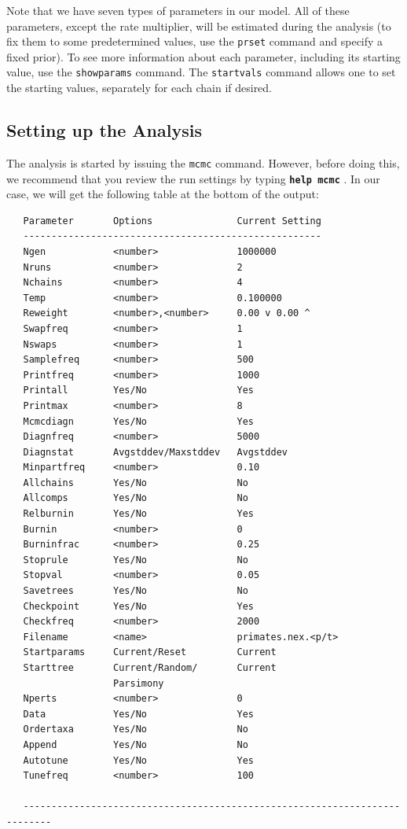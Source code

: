 \documentclass[12pt]{book}
\newcommand{\ttt}[1]{\texttt{#1} }
\newcommand{\tb}[1]{\ttt{\textbf{#1}} }
\begin{document}
Note that we have seven types of parameters in our model. All of these parameters, except the rate
multiplier, will be estimated during the analysis (to fix them to some predetermined values, use
the \ttt{prset} command and specify a fixed prior). To see more information about each
parameter, including its starting value, use the \ttt{showparams} command. The
\ttt{startvals} command allows one to set the starting values, separately for each chain if
desired.

\subsection{Setting up the Analysis}

The analysis is started by issuing the \ttt{mcmc} command. However, before doing this, we
recommend that you review the run settings by typing \tb{help mcmc}. In our case, we will get
the following table at the bottom of the output:

\begin{singlespacing}
\footnotesize
\begin{verbatim}
   Parameter       Options               Current Setting
   -----------------------------------------------------
   Ngen            <number>              1000000
   Nruns           <number>              2
   Nchains         <number>              4
   Temp            <number>              0.100000
   Reweight        <number>,<number>     0.00 v 0.00 ^
   Swapfreq        <number>              1
   Nswaps          <number>              1
   Samplefreq      <number>              500
   Printfreq       <number>              1000
   Printall        Yes/No                Yes
   Printmax        <number>              8
   Mcmcdiagn       Yes/No                Yes
   Diagnfreq       <number>              5000
   Diagnstat       Avgstddev/Maxstddev   Avgstddev
   Minpartfreq     <number>              0.10
   Allchains       Yes/No                No
   Allcomps        Yes/No                No
   Relburnin       Yes/No                Yes
   Burnin          <number>              0
   Burninfrac      <number>              0.25
   Stoprule        Yes/No                No
   Stopval         <number>              0.05
   Savetrees       Yes/No                No
   Checkpoint      Yes/No                Yes
   Checkfreq       <number>              2000
   Filename        <name>                primates.nex.<p/t>
   Startparams     Current/Reset         Current
   Starttree       Current/Random/       Current
                   Parsimony
   Nperts          <number>              0
   Data            Yes/No                Yes
   Ordertaxa       Yes/No                No
   Append          Yes/No                No
   Autotune        Yes/No                Yes
   Tunefreq        <number>              100

   ---------------------------------------------------------------------------
\end{verbatim}
\normalsize
\end{singlespacing}
\end{document}
